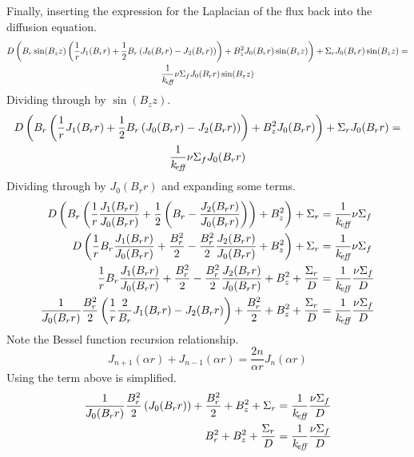   Finally, inserting the expression for the Laplacian of the flux back into the
  diffusion equation.
  \begin{multline}
    D \left( B_r \sin(B_z z) \left( \frac{1}{r} J_1(B_r r) + \frac{1}{2} B_r
    \left( J_0(B_r r) - J_2(B_r r) \right) \right) + B_z^2 J_0(B_r r) \sin(B_z
    z) \right) + \Sigma_r J_0(B_r r) \sin(B_z z) = \\
    \frac{1}{k_{\!\mbox{\scriptsize \em eff}}} \nu \Sigma_f J_0(B_r r) \sin(B_z z)
  \end{multline}
  Dividing through by $\sin(B_z z)$.
  \begin{multline}
    D \left( B_r \left( \frac{1}{r} J_1(B_r r) + \frac{1}{2} B_r
    \left( J_0(B_r r) - J_2(B_r r) \right) \right) + B_z^2 J_0(B_r r) \right)+
    \Sigma_r J_0(B_r r) = 
    \\\frac{1}{k_{\!\mbox{\scriptsize \em eff}}} \nu \Sigma_f J_0(B_r r) 
  \end{multline}
  Dividing through by $J_0(B_r r)$ and expanding some terms.
  \begin{align}
    D \left( B_r \left( \frac{1}{r} \frac{J_1(B_r r)}{J_0(B_r r)} + 
      \frac{1}{2} \left(B_r - \frac{J_2(B_r r)}{J_0(B_r r)} \right) \right) 
      + B_z^2 \right)+ \Sigma_r &= \frac{1}{k_{\!\mbox{\scriptsize \em eff}}} \nu \Sigma_f \\
    D \left( \frac{1}{r} B_r \frac{J_1(B_r r)}{J_0(B_r r)} + \frac{B_r^2}{2} -
      \frac{B_r^2}{2} \frac{J_2(B_r r)}{J_0(B_r r)} + B_z^2 \right) + \Sigma_r&=
      \frac{1}{k_{\!\mbox{\scriptsize \em eff}}} \nu \Sigma_f  \\
    \frac{1}{r} B_r \frac{J_1(B_r r)}{J_0(B_r r)} + \frac{B_r^2}{2} -
      \frac{B_r^2}{2} \frac{J_2(B_r r)}{J_0(B_r r)} + B_z^2 + 
      \frac{\Sigma_r}{D} &= \frac{1}{k_{\!\mbox{\scriptsize \em eff}}} \frac{\nu \Sigma_f}{D}\\
    \frac{1}{J_0(B_r r)} \frac{B_r^2}{2} \left(\frac{1}{r} \frac{2}{B_r} 
      J_1(B_r r) - J_2(B_r r) \right) + \frac{B_r^2}{2} + B_z^2 + 
      \frac{\Sigma_r}{D} &= \frac{1}{k_{\!\mbox{\scriptsize \em eff}}} \frac{\nu \Sigma_f}{D}
  \end{align}
  Note the Bessel function recursion relationship.
  \begin{equation} \label{eq:bessel_recursion}
    J_{n+1}(\alpha r) + J_{n-1}(\alpha r) = \frac{2n}{\alpha r} J_n(\alpha r)
  \end{equation}
  Using  the term above is simplified.
  \begin{align}
    \frac{1}{J_0(B_r r)} \frac{B_r^2}{2} \left( J_0(B_r r) \right) + 
      \frac{B_r^2}{2} + B_z^2 + \Sigma_r &= \frac{1}{k_{\!\mbox{\scriptsize \em eff}}} 
      \frac{\nu \Sigma_f}{D} \\
    B_r^2 + B_z^2 + \frac{\Sigma_r}{D} &= \frac{1}{k_{\!\mbox{\scriptsize \em eff}}} \frac{\nu \Sigma_f}
      {D}
  \end{align}
